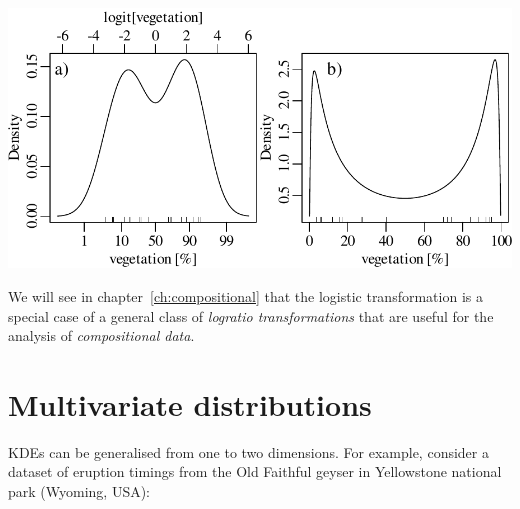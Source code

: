 \noindent\begin{minipage}[t][][b]{.6\textwidth}
  \includegraphics[width=\textwidth]{../figures/logitKDE.pdf}\\
\end{minipage}
\begin{minipage}[t][][t]{.4\textwidth}
  \label{fig:logitKDE}
\end{minipage}

We will see in chapter~\ref{ch:compositional} that the logistic
transformation is a special case of a general class of \emph{logratio
  transformations} that are useful for the analysis of
\emph{compositional data}.

\section{Multivariate distributions}
\label{sec:multivariate}

KDEs can be generalised from one to two dimensions.  For example,
consider a dataset of eruption timings from the Old Faithful geyser in
Yellowstone national park (Wyoming, USA): \\

